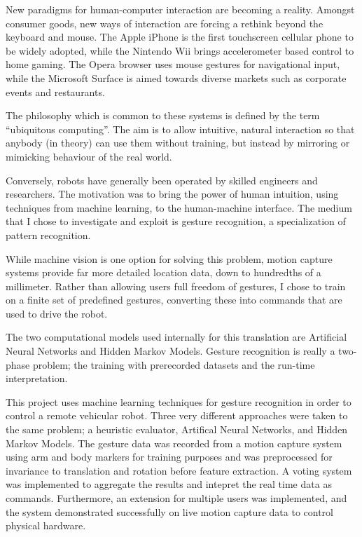 \documentclass[12pt,a4,notitlepage]{report}
\renewcommand{\_}{\texttt{\symbol{95}}}
\newcommand{\<}{\texttt{\symbol{60}}}
\renewcommand{\>}{\texttt{\symbol{62}}}
\begin{document}
New paradigms for human-computer interaction are becoming a reality. Amongst consumer goods, new ways of interaction are forcing a rethink beyond the keyboard and mouse. The Apple iPhone is the first touchscreen cellular phone to be widely adopted, while the Nintendo Wii brings accelerometer based control to home gaming. The Opera browser uses mouse gestures for navigational input, while the Microsoft Surface is aimed towards diverse markets such as corporate events and restaurants.

The philosophy which is common to these systems is defined by the term ``ubiquitous computing''. The aim is to allow intuitive, natural interaction so that anybody (in theory) can use them without training, but instead by mirroring or mimicking behaviour of the real world.

Conversely, robots have generally been operated by skilled engineers and researchers. The motivation was to bring the power of human intuition, using techniques from machine learning, to the human-machine interface. The medium that I chose to investigate and exploit is gesture recognition, a specialization of pattern recognition.

While machine vision is one option for solving this problem, motion capture systems provide far more detailed location data, down to hundredths of a millimeter. Rather than allowing users full freedom of gestures, I chose to train on a finite set of predefined gestures, converting these into commands that are used to drive the robot. 

The two computational models used internally for this translation are Artificial Neural Networks and Hidden Markov Models. Gesture recognition is really a two-phase problem; the training with prerecorded datasets and the run-time interpretation. 

This project uses machine learning techniques for gesture recognition in order to control a remote vehicular robot. Three very different approaches were taken to the same problem; a heuristic evaluator, Artifical Neural Networks, and Hidden Markov Models. The gesture data was recorded from a motion capture system using arm and body markers for training purposes and was preprocessed for invariance to translation and rotation before feature extraction. A voting system was implemented to aggregate the results and intepret the real time data as commands. Furthermore, an extension for multiple users was implemented, and the system demonstrated successfully on live motion capture data to control physical hardware.
\end{document}
